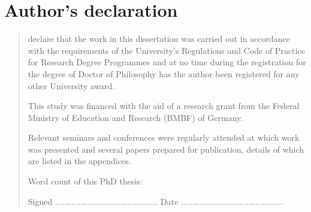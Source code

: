 %
%
%
%
%
%
\chapter*{Author's declaration}
\begin{SingleSpace}
\begin{quote}
 declare that the work in this dissertation was carried out in accordance with the requirements of the University's Regulations and Code of Practice for Research Degree Programmes and at no time during the registration for the degree of Doctor of Philosophy has the author been registered for any other University award.

This study was financed with the aid of a research grant from the Federal Ministry of Education and Research (BMBF) of Germany.

Relevant seminars and conferences were regularly attended at which work was presented and several papers prepared for publication, details of which are listed in the appendices.

Word count of this PhD thesis:  

Signed ............................................ Date ............................................
\end{quote}
\end{SingleSpace}
\clearpage